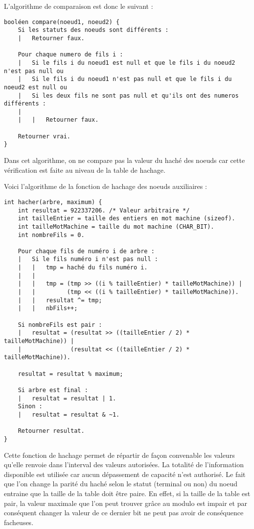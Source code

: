 \documentclass[15pt, a4paper]{article}
\begin{document}
\bigskip

\noindent L'algorithme de comparaison est donc le suivant :

\begin{verbatim}
booléen compare(noeud1, noeud2) {
    Si les statuts des noeuds sont différents :
    |   Retourner faux.

    Pour chaque numero de fils i :
    |   Si le fils i du noeud1 est null et que le fils i du noeud2 n'est pas null ou
    |   Si le fils i du noeud1 n'est pas null et que le fils i du noeud2 est null ou
    |   Si les deux fils ne sont pas null et qu'ils ont des numeros différents :
    |
    |   |   Retourner faux.

    Retourner vrai.
}
\end{verbatim}

\noindent Dans cet algorithme, on ne compare pas la valeur du haché des noeuds 
car cette vérification est faite au niveau de la table de hachage. 

\bigskip

\noindent Voici l'algorithme de la fonction de hachage des noeuds auxiliaires :

\begin{verbatim}
int hacher(arbre, maximum) {
    int resultat = 922337206. /* Valeur arbitraire */
    int tailleEntier = taille des entiers en mot machine (sizeof).
    int tailleMotMachine = taille du mot machine (CHAR_BIT).
    int nombreFils = 0.

    Pour chaque fils de numéro i de arbre :
    |   Si le fils numéro i n'est pas null :
    |   |   tmp = haché du fils numéro i.
    |   |
    |   |   tmp = (tmp >> ((i % tailleEntier) * tailleMotMachine)) |
    |   |         (tmp << ((i % tailleEntier) * tailleMotMachine)).
    |   |   resultat ^= tmp;
    |   |   nbFils++;

    Si nombreFils est pair : 
    |   resultat = (resultat >> ((tailleEntier / 2) * tailleMotMachine)) |
    |              (resultat << ((tailleEntier / 2) * tailleMotMachine)).

    resultat = resultat % maximum;

    Si arbre est final :
    |   resultat = resultat | 1.
    Sinon :
    |   resultat = resultat & ~1.

    Retourner resultat.
}
\end{verbatim}

Cette fonction de hachage permet de répartir de façon convenable les valeurs 
qu'elle renvoie dans l'interval des valeurs autorisées. La totalité de 
l'information disponible est utilisée car aucun dépassement de capacité n'est 
authorisé. Le fait que l'on change la parité du haché selon le statut (terminal 
ou non) du noeud entraine que la taille de la table doit être paire. En effet,
si la taille de la table est pair, la valeur maximale que l'on peut trouver 
grâce au modulo est impair et par conséquent changer la valeur de ce dernier
bit ne peut pas avoir de conséquence facheuses.
\end{document}
